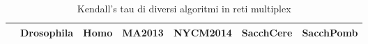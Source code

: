 \begin{table}[!htbp]
    \caption{Kendall's tau di diversi algoritmi in reti multiplex}
    \label{tab:taumux}
    \centering
    \begin{tabular}{lrrrrrr}
        \toprule
          & Drosophila & Homo & MA2013 & NYCM2014 
          & SacchCere & SacchPomb \\
        \midrule

\end{tabular}
\end{table}
